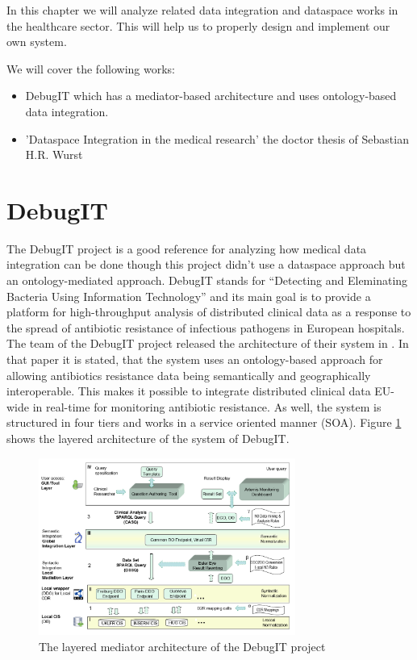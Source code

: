 
In this chapter we will analyze related data integration and dataspace works in the healthcare sector. This will help us to properly design and implement our own system.

We will cover the following works:

\begin{itemize}
\item DebugIT which has a mediator-based architecture and uses ontology-based data integration.
\item 'Dataspace Integration in the medical research' the doctor thesis of Sebastian H.R. Wurst
\end{itemize}

\section{DebugIT}
The DebugIT project is a good reference for analyzing how medical data integration can be done though this project didn't use a dataspace approach but an ontology-mediated \cite{WurstDiss, DBLP:books/dp/LeserN2006} approach. DebugIT stands for ``Detecting and Eleminating Bacteria Using Information Technology'' and its main goal is to provide a platform for high-throughput analysis of distributed clinical data as a response to the spread of antibiotic resistance of infectious pathogens in European hospitals\cite{UniFreiburgDebugITInfo}. 
The team of the DebugIT project released the architecture of their system in \cite{DBLP:conf/swat4ls/SchoberCDEDJTPLB14}.
In that paper it is stated, that the system uses an ontology-based approach for allowing antibiotics resistance data being semantically and geographically interoperable. This makes it possible to integrate distributed clinical data EU-wide in real-time for monitoring antibiotic resistance. As well, the system is structured in four tiers and works in a service oriented manner (SOA). Figure \ref{DebugITArchitectureFigure} shows the layered architecture of the system of DebugIT.

\begin{figure}[]
	\begin{center}
		\includegraphics[width=0.75\textwidth]{figures/DebugIT-Ontology-mediated-layered-Data-Integration-architecture.png}
	\end{center}
	\caption{The layered mediator architecture of the DebugIT project}
	\label{DebugITArchitectureFigure}
\end{figure}

